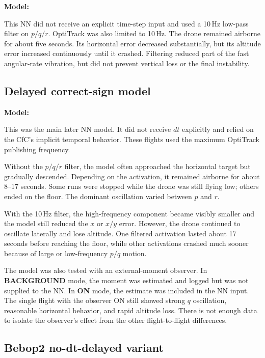 \documentclass[11pt,a4paper]{article}
\begin{document}
\textbf{Model:} 

This NN did not receive an explicit time-step input and used a 10\,Hz low-pass filter on $p/q/r$. OptiTrack was also limited to 10\,Hz. The drone remained airborne for about five seconds. Its horizontal error decreased substantially, but its altitude error increased continuously until it crashed. Filtering reduced part of the fast angular-rate vibration, but did not prevent vertical loss or the final instability.

\subsection{Delayed correct-sign model}

\textbf{Model:} 

This was the main later NN model. It did not receive $dt$ explicitly and relied on the CfC's implicit temporal behavior. These flights used the maximum OptiTrack publishing frequency.

Without the $p/q/r$ filter, the model often approached the horizontal target but gradually descended. Depending on the activation, it remained airborne for about 8--17 seconds. Some runs were stopped while the drone was still flying low; others ended on the floor. The dominant oscillation varied between $p$ and $r$.

With the 10\,Hz filter, the high-frequency component became visibly smaller and the model still reduced the $x$ or $x/y$ error. However, the drone continued to oscillate laterally and lose altitude. One filtered activation lasted about 17 seconds before reaching the floor, while other activations crashed much sooner because of large or low-frequency $p/q$ motion.

The model was also tested with an external-moment observer. In \textbf{BACKGROUND} mode, the moment was estimated and logged but was not supplied to the NN. In \textbf{ON} mode, the estimate was included in the NN input. The single flight with the observer ON still showed strong $q$ oscillation, reasonable horizontal behavior, and rapid altitude loss. There is not enough data to isolate the observer's effect from the other flight-to-flight differences.

\subsection{Bebop2 no-dt-delayed variant}
\end{document}
